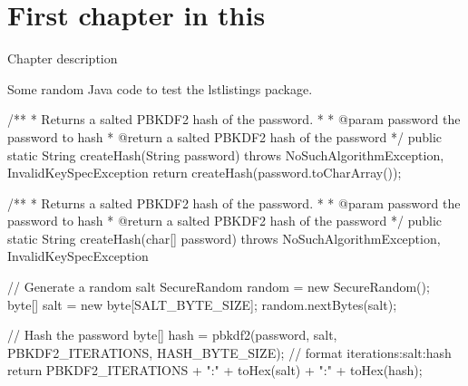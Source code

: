 \chapter{First chapter in this}%
Chapter description \parencite{DUMMY:1}

Some random Java code to test the lstlistings package.

\begin{javacode}{}
/**
 * Returns a salted PBKDF2 hash of the password.
 *
 * @param   password    the password to hash
 * @return              a salted PBKDF2 hash of the password
 */
public static String createHash(String password)
    throws NoSuchAlgorithmException, InvalidKeySpecException
{
    return createHash(password.toCharArray());
}

/**
 * Returns a salted PBKDF2 hash of the password.
 *
 * @param   password    the password to hash
 * @return              a salted PBKDF2 hash of the password
 */
public static String createHash(char[] password)
    throws NoSuchAlgorithmException, InvalidKeySpecException
{
    // Generate a random salt
    SecureRandom random = new SecureRandom();
    byte[] salt = new byte[SALT_BYTE_SIZE];
    random.nextBytes(salt);

    // Hash the password
    byte[] hash = pbkdf2(password, salt, PBKDF2_ITERATIONS, HASH_BYTE_SIZE);
    // format iterations:salt:hash
    return PBKDF2_ITERATIONS + ":" + toHex(salt) + ":" +  toHex(hash);
}

\end{javacode}

%